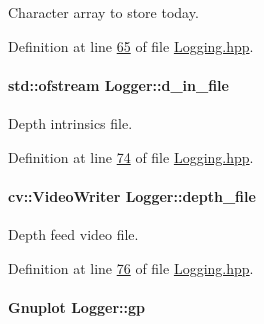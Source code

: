 Character array to store today. 



Definition at line \hyperlink{Logging_8hpp_source_l00065}{65} of file \hyperlink{Logging_8hpp_source}{Logging.\+hpp}.

\paragraph[{\texorpdfstring{d\+\_\+in\+\_\+file}{d_in_file}}]{\setlength{\rightskip}{0pt plus 5cm}std\+::ofstream Logger\+::d\+\_\+in\+\_\+file\hspace{0.3cm}{\ttfamily [private]}}\hypertarget{classLogger_acf9b6a89a6f8c520d010d87cff33b9df}{}\label{classLogger_acf9b6a89a6f8c520d010d87cff33b9df}


Depth intrinsics file. 



Definition at line \hyperlink{Logging_8hpp_source_l00074}{74} of file \hyperlink{Logging_8hpp_source}{Logging.\+hpp}.

\paragraph[{\texorpdfstring{depth\+\_\+file}{depth_file}}]{\setlength{\rightskip}{0pt plus 5cm}cv\+::\+Video\+Writer Logger\+::depth\+\_\+file\hspace{0.3cm}{\ttfamily [private]}}\hypertarget{classLogger_a5e5b9ad704575bda69b184a5b136735f}{}\label{classLogger_a5e5b9ad704575bda69b184a5b136735f}


Depth feed video file. 



Definition at line \hyperlink{Logging_8hpp_source_l00076}{76} of file \hyperlink{Logging_8hpp_source}{Logging.\+hpp}.

\paragraph[{\texorpdfstring{gp}{gp}}]{\setlength{\rightskip}{0pt plus 5cm}Gnuplot Logger\+::gp\hspace{0.3cm}{\ttfamily [private]}}\hypertarget{classLogger_a63eca256c57dee44717f3002654887c7}{}\label{classLogger_a63eca256c57dee44717f3002654887c7}


